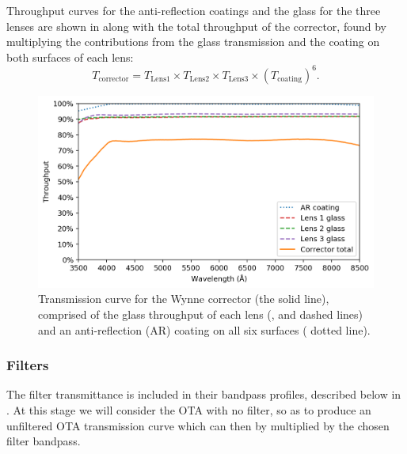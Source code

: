 \begin{colsection}
\begin{colsection}
Throughput curves for the anti-reflection coatings and the glass for the three lenses are shown in  along with the total throughput of the corrector, found by multiplying the contributions from the glass transmission and the coating on both surfaces of each lens:
%
\begin{equation}
    T_\text{corrector} = T_\text{Lens1} \times
                         T_\text{Lens2} \times
                         T_\text{Lens3} \times
                         {(T_\text{coating})}^6.
    \label{eq:corrector}
\end{equation}

\newpage

\begin{figure}[t]
    \begin{center}
        \includegraphics[width=\textwidth]{images/throughput/trans_lenses.png}
    \end{center}
    \caption[Wynne corrector transmission curve]{
        Transmission curve for the Wynne corrector (the  solid line), comprised of the glass throughput of each lens (,  and  dashed lines) and an anti-reflection (AR) coating on all six surfaces ( dotted line).
    }\label{fig:trans_lenses}
\end{figure}

\subsubsection{Filters}

The filter transmittance is included in their bandpass profiles, described below in . At this stage we will consider the OTA with no filter, so as to produce an unfiltered OTA transmission curve which can then by multiplied by the chosen filter bandpass.


\end{colsection}
\end{colsection}
